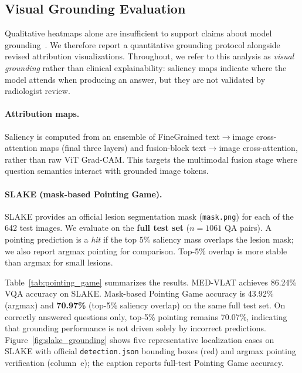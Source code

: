 
\subsection{Visual Grounding Evaluation}
\label{sec:visual_grounding}

Qualitative heatmaps alone are insufficient to support claims about model
grounding~\cite{chefer2021transformer}.
We therefore report a quantitative grounding protocol alongside revised
attribution visualizations.
Throughout, we refer to this analysis as \emph{visual grounding} rather than
clinical explainability: saliency maps indicate where the model attends when
producing an answer, but they are not validated by radiologist review.

\paragraph{Attribution maps.}
Saliency is computed from an ensemble of FineGrained text$\rightarrow$image
cross-attention maps (final three layers) and fusion-block
text$\rightarrow$image cross-attention, rather than raw ViT Grad-CAM.
This targets the multimodal fusion stage where question semantics interact
with grounded image tokens.

\paragraph{SLAKE (mask-based Pointing Game).}
SLAKE provides an official lesion segmentation mask (\texttt{mask.png}) for
each of the 642 test images.
We evaluate on the \textbf{full test set} ($n{=}1061$ QA pairs).
A pointing prediction is a \emph{hit} if the top 5\% saliency mass overlaps
the lesion mask; we also report argmax pointing for comparison.
Top-5\% overlap is more stable than argmax for small lesions.

Table~\ref{tab:pointing_game} summarizes the results.
MED-VLAT achieves 86.24\% VQA accuracy on SLAKE.
Mask-based Pointing Game accuracy is 43.92\% (argmax) and
\textbf{70.97\%} (top-5\% saliency overlap) on the same full test set.
On correctly answered questions only, top-5\% pointing remains 70.07\%,
indicating that grounding performance is not driven solely by incorrect
predictions.
Figure~\ref{fig:slake_grounding} shows five representative localization cases
on SLAKE with official \texttt{detection.json} bounding boxes (red) and
argmax pointing verification (column~e); the caption reports full-test
Pointing Game accuracy.

